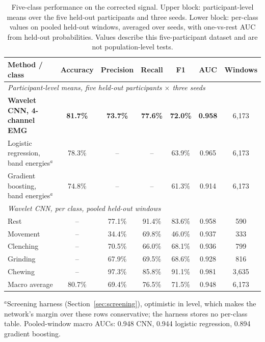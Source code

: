 \documentclass[pdflatex,sn-nature,iicol]{sn-jnl}
\begin{document}
\begin{table}[t]
  \centering
  \caption{Five-class performance on the corrected signal. Upper block: participant-level means over the five held-out participants and three seeds. Lower block: per-class values on pooled held-out windows, averaged over seeds, with one-vs-rest AUC from held-out probabilities. Values describe this five-participant dataset and are not population-level tests.}
  \label{tab:results}
  \footnotesize
  \begin{tabular*}{\textwidth}{@{\extracolsep{\fill}}lcccccc@{}}
    \toprule
    Method / class & Accuracy & Precision & Recall & F1 & AUC & Windows \\
    \midrule
    \multicolumn{7}{l}{\emph{Participant-level means, five held-out participants $\times$ three seeds}}\\
    \textbf{Wavelet CNN, 4-channel EMG} & \textbf{81.7\%} & \textbf{73.7\%} & \textbf{77.6\%} & \textbf{72.0\%} & \textbf{0.958} & 6,173 \\
    Logistic regression, band energies$^{a}$ & 78.3\% & -- & -- & 63.9\% & 0.965 & 6,173 \\
    Gradient boosting, band energies$^{a}$ & 74.8\% & -- & -- & 61.3\% & 0.914 & 6,173 \\
    \midrule
    \multicolumn{7}{l}{\emph{Wavelet CNN, per class, pooled held-out windows}}\\
    Rest & -- & 77.1\% & 91.4\% & 83.6\% & 0.958 & 590 \\
    Movement & -- & 34.4\% & 69.8\% & 46.0\% & 0.937 & 333 \\
    Clenching & -- & 70.5\% & 66.0\% & 68.1\% & 0.936 & 799 \\
    Grinding & -- & 67.9\% & 69.5\% & 68.6\% & 0.928 & 816 \\
    Chewing & -- & 97.3\% & 85.8\% & 91.1\% & 0.981 & 3,635 \\
    Macro average & 80.7\% & 69.4\% & 76.5\% & 71.5\% & 0.948 & 6,173 \\
    \bottomrule
  \end{tabular*}
  \begin{flushleft}\footnotesize
  $^{a}$Screening harness (Section~\ref{sec:screening}), optimistic in level, which makes the network's margin over these rows conservative; the harness stores no per-class table. Pooled-window macro AUCs: 0.948 CNN, 0.944 logistic regression, 0.894 gradient boosting.
  \end{flushleft}
\end{table}
\end{document}
